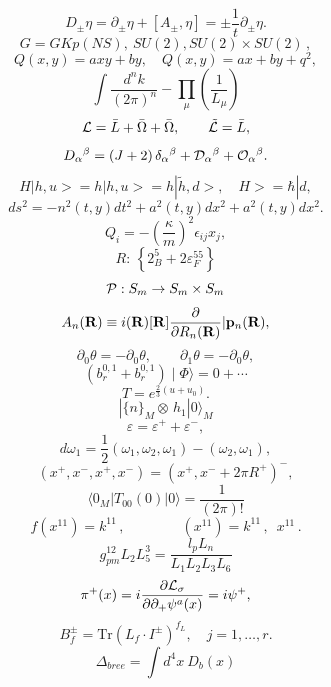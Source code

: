 \documentclass{article}
\begin{document}
$$D _ { \pm } \eta = \partial _ { \pm } \eta + [ A _ { \pm } , \eta ] = \pm \frac { 1 } { t } \partial _ { \pm } \eta .$$
$$G = G K p \left ( N S \right ) , \ S U ( 2 ) , S U ( 2 ) \times S U ( 2 ) \, ,$$
$$Q ( x , y ) = a x y + b y , \quad Q ( x , y ) = a x + b y + q ^ { 2 } ,$$
$$\int \frac { d ^ { n } k } { ( 2 \pi ) ^ { n } } - \prod _ { \mu } \left ( \frac { 1 } { L _ { \mu } } \right )$$
$${ \cal L } = \bar { L } + \bar { \Omega } + \bar { \Omega } , \qquad \tilde { \cal L } = \bar { L } ,$$
$$D _ { \alpha } { } ^ { \beta } = ( J + 2 ) \, \delta _ { \alpha } { } ^ { \beta } + { \cal D } _ { \alpha } { } ^ { \beta } + { \cal O } _ { \alpha } { } ^ { \beta } .$$
$$H | h , u > = h | h , u > = h | \tilde { h } , d > , \quad H > = \hbar | d ,$$
$$d s ^ { 2 } = - n ^ { 2 } ( t , y ) d t ^ { 2 } + a ^ { 2 } ( t , y ) d x ^ { 2 } + a ^ { 2 } ( t , y ) d x ^ { 2 } .$$
$$Q _ { i } = - ( \frac { \kappa } { m } ) ^ { 2 } \epsilon _ { i j } x _ { j } ,$$
$$R : \, \left \{ 2 _ { B } ^ { 5 } + 2 \varepsilon _ { F } ^ { 5 5 } \right \}$$
$${ \cal P } : S _ { m } \rightarrow S _ { m } \times S _ { m }$$
$$A _ { n } ( { \bf R } ) \equiv i ( { \bf R } ) [ { \bf R } ] { \frac { \partial } { \partial R _ { n } ( { \bf R } ) } } | { \bf { p } } _ { n } ( { \bf R } ) ,$$
$$\partial _ { 0 } \theta = - \partial _ { 0 } \theta , \qquad \partial _ { 1 } \theta = - \partial _ { 0 } \theta ,$$
$$( b _ { r } ^ { 0 , 1 } + b _ { r } ^ { 0 , 1 } ) \mid \Phi \rangle = 0 + \cdots$$
$$T = e ^ { \frac { 2 } { 3 } ( u + u _ { 0 } ) } .$$
$$| \{ n \} _ { M } \otimes \, h _ { 1 } | 0 \rangle _ { M }$$
$$\varepsilon = \varepsilon ^ { + } + \varepsilon ^ { - } ,$$
$$d \omega _ { 1 } = \frac { 1 } { 2 } ( \omega _ { 1 } , \omega _ { 2 } , \omega _ { 1 } ) - ( \omega _ { 2 } , \omega _ { 1 } ) ,$$
$$( x ^ { + } , x ^ { - } , x ^ { + } , x ^ { - } ) = ( x ^ { + } , x ^ { - } + 2 \pi R ^ { + } ) ^ { - } ,$$
$$\langle 0 _ { M } | T _ { 0 0 } ( 0 ) | 0 \rangle = \frac { 1 } { ( 2 \pi ) ! }$$
$$f ( x ^ { 1 1 } ) = k ^ { 1 1 } \, , \qquad \qquad ( x ^ { 1 1 } ) = k ^ { 1 1 } \, , \, \, \, x ^ { 1 1 } \, .$$
$$g _ { p m } ^ { 1 2 } L _ { 2 } L _ { 5 } ^ { 3 } = \frac { l _ { p } L _ { n } } { L _ { 1 } L _ { 2 } L _ { 3 } L _ { 6 } }$$
$$\pi ^ { + } ( x ) = i \frac { \partial { \cal L } _ { \sigma } } { \partial \partial _ { + } \psi ^ { a } ( x ) } = i \psi ^ { + } ,$$
$$B _ { f } ^ { \pm } = \mathrm { T r } ( L _ { f } \cdot I ^ { \pm } ) ^ { f _ { L } } , \quad j = 1 , \ldots , r .$$
$$\Delta _ { b r e e } = \int d ^ { 4 } x ~ D _ { b } ( x )$$
\end{document}

